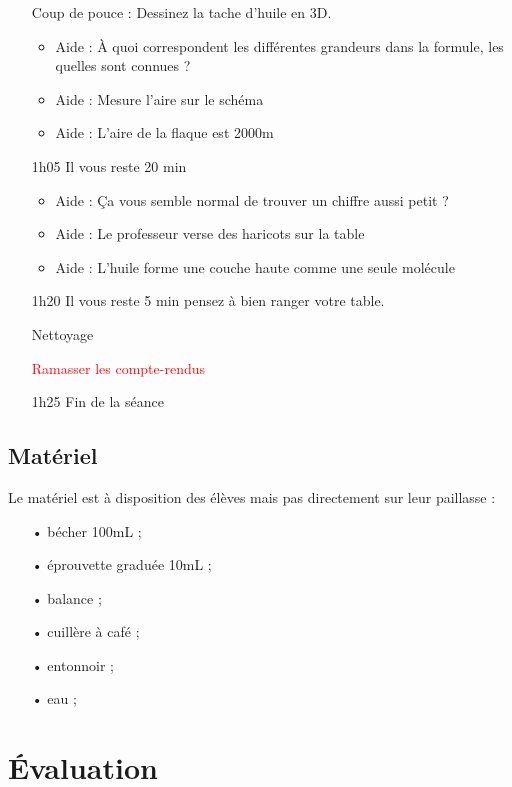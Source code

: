 \documentclass[12pt,a4paper]{article}
\begin{document}
\begin{itemize}
Coup de pouce : Dessinez la tache d'huile en 3D.

\begin{itemize}
\item Aide : À quoi correspondent les différentes grandeurs dans la formule, les quelles sont connues ?
\item Aide : Mesure l'aire sur le schéma
\item Aide : L'aire de la flaque est \unit{2000}{m\squared}
\end{itemize}

\item[1h05]
\og Il vous reste 20 min \fg{}

\begin{itemize}
\item Aide : Ça vous semble normal de trouver un chiffre aussi petit ?
\item Aide : Le professeur verse des haricots sur la table
\item Aide : L'huile forme une couche haute comme une seule molécule
\end{itemize}

\item[1h20]
\og Il vous reste 5 min pensez à bien ranger votre table. \fg{} 

Nettoyage

\textcolor{red}{Ramasser les compte-rendus}
 
\item[1h25] Fin de la séance
\end{itemize}

\subsection{Matériel}

Le matériel est à disposition des élèves mais pas directement sur leur paillasse :
\begin{itemize}
\item[•] bécher \unit{100}{mL} ;
\item[•] éprouvette graduée \unit{10}{mL} ;
\item[•] balance ;
\item[•] cuillère à café ;
\item[•] entonnoir ;
\item[•] eau ;
\end{itemize}

\section{Évaluation}
\end{document}
